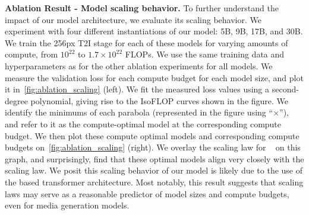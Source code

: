 \noindent\textbf{Ablation Result - Model scaling behavior.}
To further understand the impact of our model architecture, we evaluate its scaling behavior. We experiment with four different instantiations of our model: 5B, 9B, 17B, and 30B. We train the 256px T2I stage for each of these models for varying amounts of compute, from $10^{22}$ to $1.7\times 10^{22}$ FLOPs. We use the same training data and hyperparameters as for the other ablation experiments for all models. We measure the validation loss for each compute budget for each model size, and plot it in~\cref{fig:ablation_scaling} (left). We fit the measured loss values using a second-degree polynomial, giving rise to the IsoFLOP curves shown in the figure. We identify the minimums of each parabola (represented in the figure using ``$\times$''), and refer to it as the compute-optimal model at the corresponding compute budget. We then plot these compute optimal models and corresponding compute budgets on~\cref{fig:ablation_scaling} (right). We overlay the scaling law for \llama~\citep{llama3} on this graph, and surprisingly, find that these optimal models align very closely with the \llama scaling law. We posit this scaling behavior of our model is likely due to the use of the \llama based transformer architecture. Most notably, this result suggests that \llama scaling laws may serve as a reasonable predictor of model sizes and compute budgets, even for media generation models.

\begin{table}[t]
    \centering
    \caption{\textbf{Architecture differences between \OURS's \llama architecture and DiT.} All other hyperparameters remain equal for the architecture ablation.}
    \label{tab:ablation_architecture_details}
\end{table}

